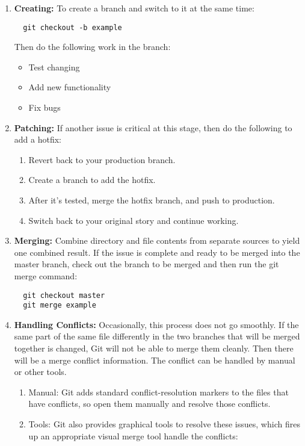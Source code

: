 \documentclass[draftclsnofoot,journal,onecolumn,12pt]{IEEEtran}
\begin{document}
\begin{enumerate}
\item \textbf{Creating:} To create a branch and switch to it at the same time:
\begin{verbatim}
  git checkout -b example
\end{verbatim}
Then do the following work in the branch:
  \begin{itemize}
    \item Test changing
    \item Add new functionality
    \item Fix bugs
  \end{itemize}
\item \textbf{Patching:} If another issue is critical at this stage, then do the following to add a hotfix:
\begin{enumerate}
  \item Revert back to your production branch.
  \item Create a branch to add the hotfix.
  \item After it’s tested, merge the hotfix branch, and push to production.
  \item Switch back to your original story and continue working.
\end{enumerate}
\item \textbf{Merging:} Combine directory and file contents from separate sources to yield one combined result. If the issue is complete and ready to be merged into the master branch, check out the branch to be merged and then run the git merge command:
\begin{verbatim}
  git checkout master
  git merge example
\end{verbatim}
\item \textbf{Handling Conflicts:} Occasionally, this process does not go smoothly. If the same part of the same file differently in the two branches that will be merged together is changed, Git will not be able to merge them cleanly. Then there will be a merge conflict information. The conflict can be handled by manual or other tools.
  \begin{enumerate}
    \item Manual: Git adds standard conflict-resolution markers to the files that have conflicts, so open them manually and resolve those conflicts.
    \item Tools: Git also provides graphical tools to resolve these issues, which fires up an appropriate visual merge tool handle the conflicts:
  \end{enumerate}

\end{enumerate}
\end{document}
